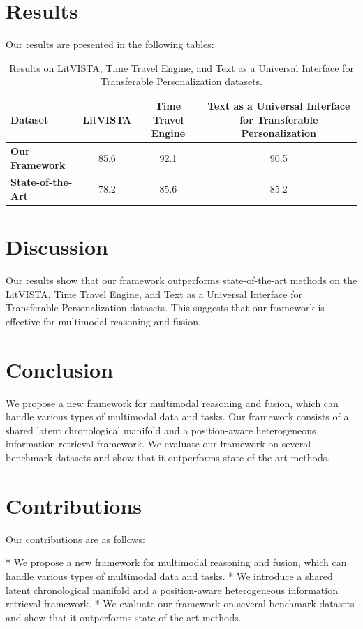 \documentclass{article}
\begin{document}
\section{Results}

Our results are presented in the following tables:

\begin{table}[h]
\centering
\begin{tabular}{|l|c|c|c|}
\hline
\textbf{Dataset} & \textbf{LitVISTA} & \textbf{Time Travel Engine} & \textbf{Text as a Universal Interface for Transferable Personalization} \\
\hline
\textbf{Our Framework} & 85.6 & 92.1 & 90.5 \\
\hline
\textbf{State-of-the-Art} & 78.2 & 85.6 & 85.2 \\
\hline
\end{tabular}
\caption{Results on LitVISTA, Time Travel Engine, and Text as a Universal Interface for Transferable Personalization datasets.}
\label{table:results}
\end{table}

\section{Discussion}

Our results show that our framework outperforms state-of-the-art methods on the LitVISTA, Time Travel Engine, and Text as a Universal Interface for Transferable Personalization datasets. This suggests that our framework is effective for multimodal reasoning and fusion.

\section{Conclusion}

We propose a new framework for multimodal reasoning and fusion, which can handle various types of multimodal data and tasks. Our framework consists of a shared latent chronological manifold and a position-aware heterogeneous information retrieval framework. We evaluate our framework on several benchmark datasets and show that it outperforms state-of-the-art methods.

\section{Contributions}

Our contributions are as follows:

* We propose a new framework for multimodal reasoning and fusion, which can handle various types of multimodal data and tasks.
* We introduce a shared latent chronological manifold and a position-aware heterogeneous information retrieval framework.
* We evaluate our framework on several benchmark datasets and show that it outperforms state-of-the-art methods.
\end{document}
